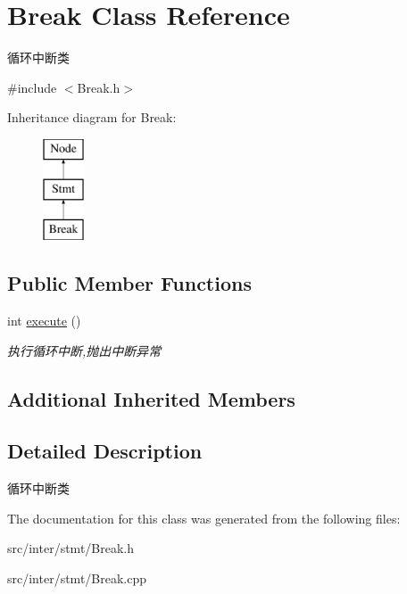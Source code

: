 \hypertarget{class_break}{}\section{Break Class Reference}
\label{class_break}


循环中断类  




{\ttfamily \#include $<$Break.\+h$>$}

Inheritance diagram for Break\+:\begin{figure}[H]
\begin{center}
\leavevmode
\includegraphics[height=3.000000cm]{class_break}
\end{center}
\end{figure}
\subsection*{Public Member Functions}
\begin{DoxyCompactItemize}
\item 
\mbox{\label{class_break_a554fd4cae05d203145d62868f73004d4}} 
int \hyperlink{class_break_a554fd4cae05d203145d62868f73004d4}{execute} ()
\begin{DoxyCompactList}\small\item\em 执行循环中断,抛出中断异常 \end{DoxyCompactList}\end{DoxyCompactItemize}
\subsection*{Additional Inherited Members}


\subsection{Detailed Description}
循环中断类 

The documentation for this class was generated from the following files\+:\begin{DoxyCompactItemize}
\item 
src/inter/stmt/Break.\+h\item 
src/inter/stmt/Break.\+cpp\end{DoxyCompactItemize}
